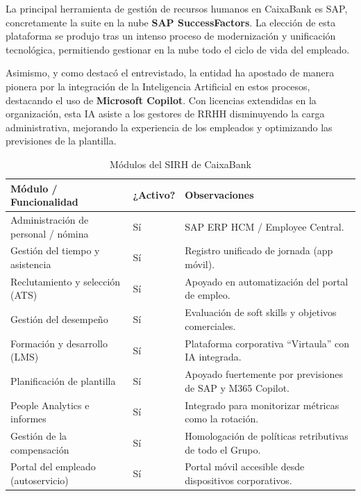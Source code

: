 La principal herramienta de gestión de recursos humanos en CaixaBank es SAP, concretamente la suite en la nube \textbf{SAP SuccessFactors}. La elección de esta plataforma se produjo tras un intenso proceso de modernización y unificación tecnológica, permitiendo gestionar en la nube todo el ciclo de vida del empleado.

Asimismo, y como destacó el entrevistado, la entidad ha apostado de manera pionera por la integración de la Inteligencia Artificial en estos procesos, destacando el uso de \textbf{Microsoft Copilot}. Con licencias extendidas en la organización, esta IA asiste a los gestores de RRHH disminuyendo la carga administrativa, mejorando la experiencia de los empleados y optimizando las previsiones de la plantilla.

\begin{table}[H]
  \centering
  \small
  \caption{Módulos del SIRH de CaixaBank}
  \begin{tabularx}{\textwidth}{p{} p{} X}
    \toprule
    \textbf{Módulo / Funcionalidad}          & \textbf{¿Activo?} & \textbf{Observaciones} \\
    \midrule
    Administración de personal / nómina       & Sí & SAP ERP HCM / Employee Central. \\
    Gestión del tiempo y asistencia           & Sí & Registro unificado de jornada (app móvil). \\
    Reclutamiento y selección (ATS)           & Sí & Apoyado en automatización del portal de empleo. \\
    Gestión del desempeño                     & Sí & Evaluación de soft skills y objetivos comerciales. \\
    Formación y desarrollo (LMS)              & Sí & Plataforma corporativa ``Virtaula'' con IA integrada. \\
    Planificación de plantilla                & Sí & Apoyado fuertemente por previsiones de SAP y M365 Copilot. \\
    People Analytics e informes               & Sí & Integrado para monitorizar métricas como la rotación. \\
    Gestión de la compensación                & Sí & Homologación de políticas retributivas de todo el Grupo. \\
    Portal del empleado (autoservicio)        & Sí & Portal móvil accesible desde dispositivos corporativos. \\
    \bottomrule
  \end{tabularx}
\end{table}

